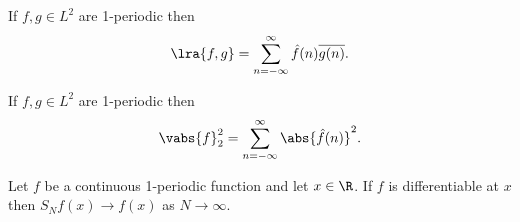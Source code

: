 \documentclass{article}
\begin{document}
\begin{theorem}[Parseval]
	If $f,g\in L^2$ are 1-periodic then
	\begin{align*}
		\lra{f,g} = \sum_{n=-\infty}^\infty \hat f(n)\overline{g(n)}.
	\end{align*}
\end{theorem}

\begin{corollary*}
	If $f,g\in L^2$ are 1-periodic then
	\begin{align*}
		\vabs{f}_2^2 = \sum_{n=-\infty}^\infty \abs{\hat f(n)}^2.
	\end{align*}
\end{corollary*}

\begin{theorem}
	Let $f$ be a continuous 1-periodic function and let $x\in\R$. If $f$ is differentiable
	at $x$ then $S_Nf(x)\to f(x)$ as $N\to\infty$.
\end{theorem}
\end{document}
